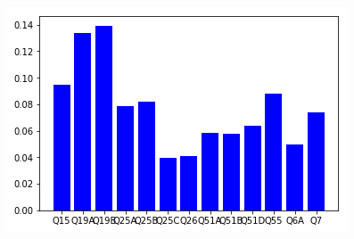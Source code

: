 {\begin{figure}[t!]
\begin{minipage}{0.24\textwidth}
	\end{minipage}
	\begin{minipage}{0.24\textwidth}%
		\includegraphics[width=\linewidth]{Images/true_2012.png}
	\end{minipage}\\
	

\end{figure}}
